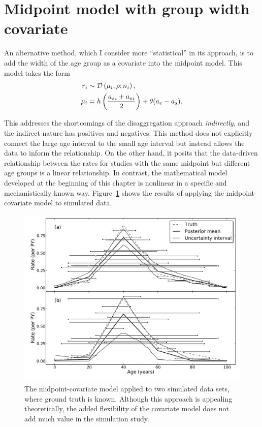 \section{Midpoint model with group width covariate}
An alternative method, which I consider more ``statistical'' in its
approach, is to add the width of the age group as a covariate into the
midpoint model.  This model takes the form
\begin{align*}
r_i &\sim \mathcal{D}\left(\mu_i, \rho; n_i\right),\\
\mu_i &= h\left(\frac{{a_s}_i+{a_e}_i}{2}\right) + \theta (a_e - a_s).
\end{align*}

This addresses the shortcomings of the disaggregation approach
\emph{indirectly}, and the indirect nature has positives and
negatives.  This method does not explicitly connect the large age
interval to the small age interval but instead allows the data to
inform the relationship.  On the other hand, it posits that the
data-driven relationship between the rates for studies with the same
midpoint but different age groups is a linear relationship. In
contrast, the mathematical model developed at the beginning of this
chapter is nonlinear in
a specific and mechanistically known way.
Figure~\ref{midpoint-covariate} shows the results of applying the midpoint-covariate
model to simulated data.


\begin{figure}[h]
\begin{center}
\includegraphics[width=\textwidth]{age_group_midpoint_covariate.pdf}
\caption[The midpoint-covariate model applied simulated
  data.]{The midpoint-covariate model applied to two simulated
  data sets, where ground truth is known. Although this approach is
  appealing theoretically, the added flexibility of the covariate
  model does not add much value in the simulation study. }
\label{midpoint-covariate}
\end{center}
\end{figure}

